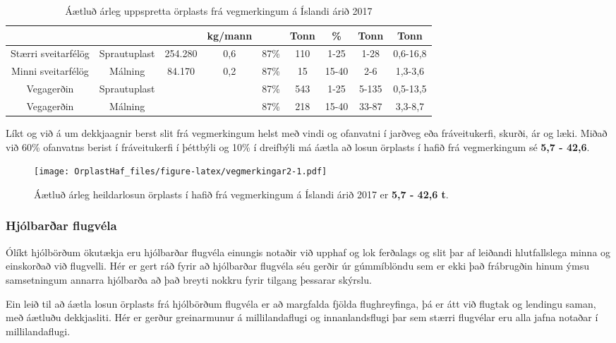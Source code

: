 \documentclass[icelandic,]{book}
\begin{document}
\begin{table}[t]

\caption{\label{tab:vegmerkingar}Áætluð árleg uppspretta örplasts frá vegmerkingum á Íslandi árið 2017}
\centering
\begin{tabular}{ccccccccc}
\toprule
 &  &  & kg/mann &  & Tonn & \% & Tonn & Tonn\\
\midrule
Stærri sveitarfélög & Sprautuplast & 254.280 & 0,6 & 87\% & 110 & 1-25 & 1-28 & 0,6-16,8\\
Minni sveitarfélög & Málning & 84.170 & 0,2 & 87\% & 15 & 15-40 & 2-6 & 1,3-3,6\\
Vegagerðin & Sprautuplast &  &  & 87\% & 543 & 1-25 & 5-135 & 0,5-13,5\\
Vegagerðin & Málning &  &  & 87\% & 218 & 15-40 & 33-87 & 3,3-8,7\\
\bottomrule
\end{tabular}
\end{table}

Líkt og við á um dekkjaagnir berst slit frá vegmerkingum helst með vindi og ofanvatni í jarðveg eða fráveitukerfi, skurði, ár og læki. Miðað við 60\% ofanvatns berist í fráveitukerfi í þéttbýli og 10\% í dreifbýli má áætla að losun örplasts í hafið frá vegmerkingum sé \textbf{5,7 - 42,6}.

\begin{figure}
\centering
\texttt{[image: OrplastHaf\_files/figure-latex/vegmerkingar2-1.pdf]}
\caption{\label{fig:vegmerkingar2}Áætluð árleg heildarlosun örplasts í hafið frá vegmerkingum á Íslandi árið 2017 er \textbf{5,7 - 42,6 t}.}
\end{figure}

\hypertarget{hjolbarar-flugvela}{%
\subsubsection*{Hjólbarðar flugvéla}\label{hjolbarar-flugvela}}

Ólíkt hjólbörðum ökutækja eru hjólbarðar flugvéla einungis notaðir við upphaf og lok ferðalags og slit þar af leiðandi hlutfallslega minna og einskorðað við flugvelli. Hér er gert ráð fyrir að hjólbarðar flugvéla séu gerðir úr gúmmíblöndu sem er ekki það frábrugðin hinum ýmsu samsetningum annarra hjólbarða að það breyti nokkru fyrir tilgang þessarar skýrslu.

Ein leið til að áætla losun örplasts frá hjólbörðum flugvéla er að margfalda fjölda flughreyfinga, þá er átt við flugtak og lendingu saman, með áætluðu dekkjasliti. Hér er gerður greinarmunur á millilandaflugi og innanlandsflugi þar sem stærri flugvélar eru alla jafna notaðar í millilandaflugi.
\end{document}
